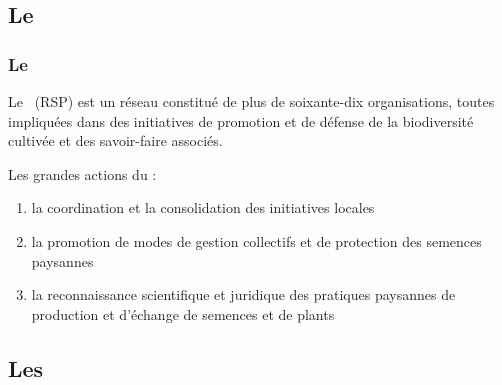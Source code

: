 


\subsection{Le \RSP}

\begin{frame}
\frametitle{Le \RSP}
Le \RSP~(RSP) est un réseau constitué de plus de soixante-dix organisations, toutes impliquées dans des initiatives de promotion et de défense de la biodiversité cultivée et des savoir-faire associés.

\vfill

Les grandes actions du \RSP:

\begin{enumerate}
\item la coordination et la consolidation des initiatives locales
\item la promotion de modes de gestion collectifs et de protection des semences paysannes
\item la reconnaissance scientifique et juridique des pratiques paysannes de production et d'échange de semences et de plants
\end{enumerate}

\end{frame}


\subsection{Les \MSPs}


